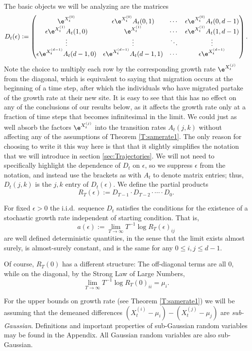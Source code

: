 \documentclass[11pt]{amsart}
\begin{document}
The basic objects we will be analyzing are the matrices
$$
	D_{t}(\epsilon):= \begin{pmatrix}
		\e^{X_t^{(0)}} & \epsilon \e^{X_t^{(0)}} A_t(0,1) &\cdots  & \epsilon \e^{X_t^{(0)}} A_t(0,d-1)\\
		\epsilon \e^{X_t^{(1)}} A_t(1,0) & \e^{X_t^{(1)}}  &\cdots & \epsilon \e^{X_t^{(1)}} A_t(1,d-1)\\
		\vdots&\vdots&\ddots & \vdots\\
		\epsilon \e^{X_t^{(d-1)}} A_t(d-1,0) & \epsilon \e^{X_t^{(d-1)}} A_t(d-1,1) &\cdots & \epsilon \e^{X_t^{(d-1)}}
	\end{pmatrix}.
$$
Note the choice to multiply each row by the corresponding growth rate $\e^{X_t^{(j)}}$ from the diagonal, which is equivalent to saying that migration occurs at the beginning of a time step, after which the individuals who have migrated partake of the growth rate at their new site.
It is easy to see that this has no effect on any of the conclusions of our results below, as it affects the growth rate only at a fraction of time steps that becomes infinitesimal in the limit.
We could just as well absorb the factors $\e^{X_t^{(j)}}$ into the transition rates $A_t(j,k)$ without affecting any of the assumptions of Theorem \ref{T:samerate1}.
The only reason for choosing to write it this way here is that that it slightly simplifies the notation that we will introduce in section \ref{sec:Trajectories}.
We will not need to specifically highlight the dependence of $D_t$ on $\epsilon$, so we suppress $\epsilon$ from the notation, and instead use the brackets as with $A_t$ to denote matrix entries; thus, $D_t(j,k)$ is the $j,k$ entry of $D_t(\epsilon)$.
We define the partial products
$$
R_{T}(\epsilon):= D_{T-1}\cdot D_{T-2}\cdot\cdots\cdot D_{0}.
$$


For fixed $\epsilon>0$ the i.i.d.\  sequence $D_{t}$
satisfies the conditions for the existence of a stochastic growth rate independent
of starting condition.\cite{jC79} 
That is, 
$$
a(\epsilon):=\lim_{T\to\infty} T^{-1}\log R_{T}(\epsilon)_{ij}
$$
are well defined deterministic quantities, in the sense that the limit exists
almost surely, is almost-surely constant, and is the same for any 
${0\le i,j\le d-1}$.

Of course, $R_{T}(0)$ has a different structure: 
The off-diagonal terms
are all 0, while on the diagonal, by the Strong Law of Large Numbers,
$$
\lim_{T\to\infty} T^{-1}\log R_{T}(0)_{ii}=\mu_{i}.
$$

For the upper bounds on growth rate (see Theorem \ref{T:samerate1}) we will be assuming that the
demeaned differences  $(X_t^{(i)}-\mu_i) - (X_t^{(j)}-\mu_j)$ are {\em sub-Gaussian}.
Definitions and important properties of sub-Gaussian random variables may be found in the Appendix.
All Gaussian random variables are also sub-Gaussian.
\end{document}
